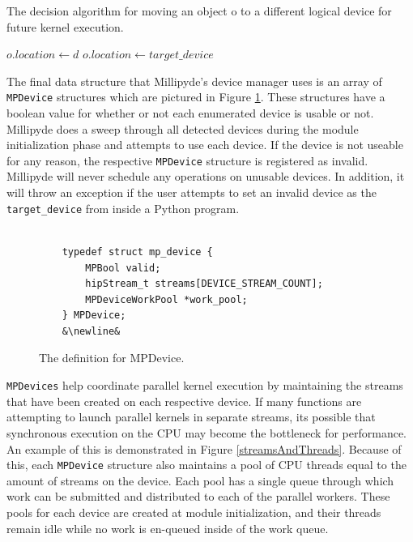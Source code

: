 \begin{algorithm}
\caption{The decision algorithm for moving an object o to a different logical device for future kernel execution.}
\label{alg:moving}
{
    {
        $o.location \gets d$\;
    }
}
\uElse
{
    {
        $o.location \gets target\_device$\;
    }
}
\end{algorithm}

\quad The final data structure that Millipyde's device manager uses is an array of \verb|MPDevice| structures which are pictured in Figure \ref{mpdevice}. These structures have a boolean value for whether or not each enumerated device is usable or not. Millipyde does a sweep through all detected devices during the module initialization phase and attempts to use each device. If the device is not useable for any reason, the respective \verb|MPDevice| structure is registered as invalid. Millipyde will never schedule any operations on unusable devices. In addition, it will throw an exception if the user attempts to set an invalid device as the \verb|target_device| from inside a Python program. 

\begin{figure}[hbtp]
    \begin{lstlisting}
    
    typedef struct mp_device {
        MPBool valid;
        hipStream_t streams[DEVICE_STREAM_COUNT];
        MPDeviceWorkPool *work_pool;
    } MPDevice;
    &\newline&
    \end{lstlisting}
    \caption{The definition for MPDevice.}
    \label{mpdevice}
\end{figure}

\quad \verb|MPDevices| help coordinate parallel kernel execution by maintaining the streams that have been created on each respective device. If many functions are attempting to launch parallel kernels in separate streams, its possible that synchronous execution on the CPU may become the bottleneck for performance. An example of this is demonstrated in Figure \ref{streamsAndThreads}. Because of this, each \verb|MPDevice| structure also maintains a pool of CPU threads equal to the amount of streams on the device. Each pool has a single queue through which work can be submitted and distributed to each of the parallel workers. These pools for each device are created at module initialization, and their threads remain idle while no work is en-queued inside of the work queue. 

